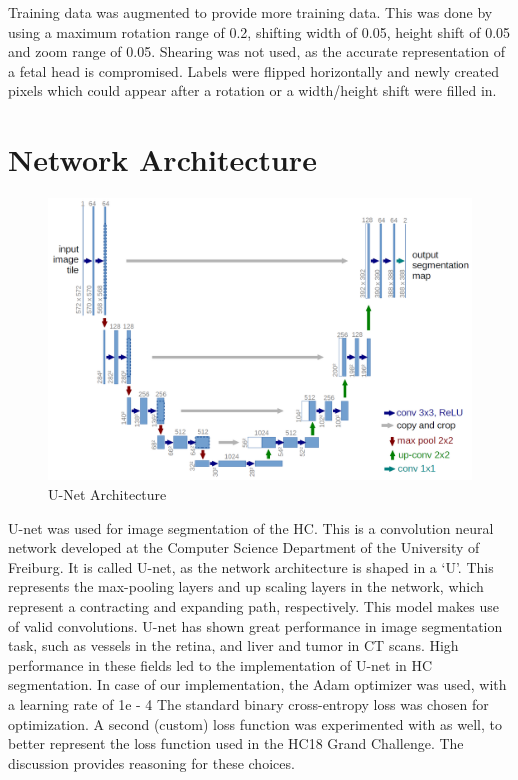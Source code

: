 \documentclass{article}
\begin{document}
Training data was augmented to provide more training data. This was done by using a maximum rotation range of 0.2, shifting width of 0.05, height shift of 0.05 and zoom range of 0.05. Shearing was not used, as the accurate representation of a fetal head is compromised. Labels were flipped horizontally and newly created pixels which could appear after a rotation or a width/height shift were filled in.
\section{Network Architecture}
\begin{figure}
    \centering
    \includegraphics[width=0.8\linewidth]{u-net-architecture.png}
    \caption{U-Net Architecture}
    \label{fig:unet}
\end{figure}
U-net was used for image segmentation of the HC. This is a convolution neural network developed at the Computer Science Department of the University of Freiburg. It is called U-net, as the network architecture is shaped in a ‘U’. This represents the max-pooling layers and up scaling layers in the network, which represent a contracting and expanding path, respectively. This model makes use of valid convolutions. U-net has shown great performance in image segmentation task, such as vessels in the retina, and liver and tumor in CT scans. High performance in these fields led to the implementation of U-net in HC segmentation. In case of our implementation, the Adam optimizer was used, with a learning rate of 1e - 4 The standard binary cross-entropy loss was chosen for optimization. A second (custom) loss function was experimented with as well, to better represent the loss function used in the HC18 Grand Challenge. The discussion provides reasoning for these choices.
\end{document}
